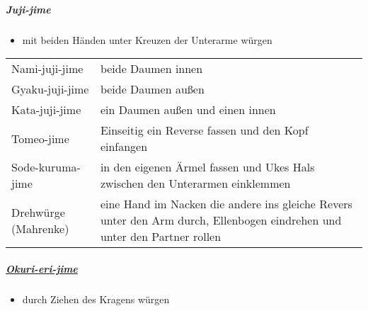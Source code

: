 \documentclass[justified, a4paper, notitlepage, captions=tableheading, nobib]{tufte-handout}
\begin{document}
\subparagraph{Juji-jime}
\label{sec:org50c8b13}
\begin{itemize}
\item mit beiden Händen unter Kreuzen der Unterarme würgen
\end{itemize}

\begin{center}
\begin{tabular}{ll}
\label{org50e3ea8}Nami-juji-jime & beide Daumen innen\\
\label{org8b33e39}Gyaku-juji-jime & beide Daumen außen\\
\label{org2d8a9fc}Kata-juji-jime & ein Daumen außen und einen innen\\
\label{org867e597}Tomeo-jime & Einseitig ein Reverse fassen und den Kopf einfangen\\
\label{org66d000c}Sode-kuruma-jime & in den eigenen Ärmel fassen und Ukes Hals zwischen den Unterarmen einklemmen\\
\label{org5a5933b}Drehwürge (Mahrenke) & eine Hand im Nacken die andere ins gleiche Revers unter den Arm durch, Ellenbogen eindrehen und unter den Partner rollen\\
\end{tabular}
\end{center}

\subparagraph{\hyperref[org41b7fb1]{Okuri-eri-jime}}
\label{sec:org36df0b6}
\begin{itemize}
\item durch Ziehen des Kragens würgen
\end{itemize}
\end{document}
